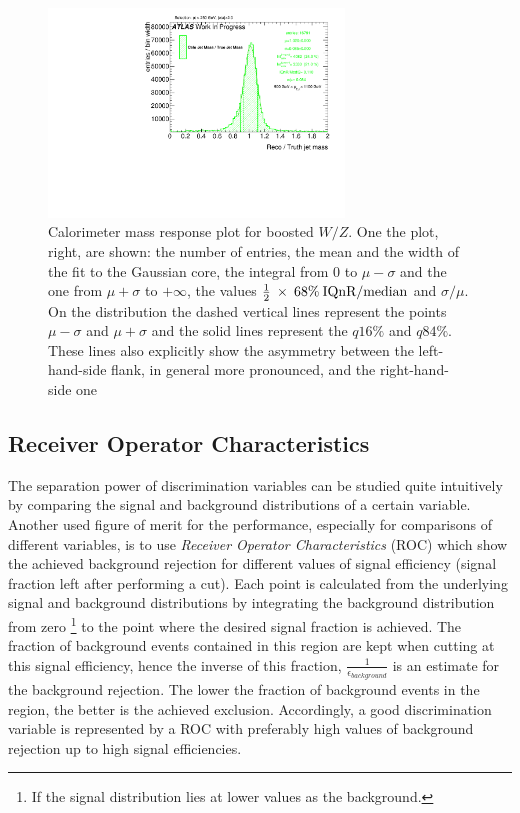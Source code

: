 \begin{figure}[!ht]
  \centering
      \includegraphics[width=0.7\textwidth]{jet_part/8ResponsePTJ_h_JetRatio_mJ05CALO.pdf}
  \caption[$\mcal$ response single $\pt$ bin]{Calorimeter mass response plot for boosted $W/Z$. One the plot, right, are shown: the number of entries, the mean and the width of the fit to the Gaussian core, the integral from 0 to $\mu-\sigma$ and the one from $\mu+\sigma$ to $+\infty$, the values $\frac{1}{2}\: \times\: 68\% \:\textrm{IQnR/median}$ and $\sigma/\mu$. On the distribution the dashed vertical lines represent the points $\mu-\sigma$ and $\mu+\sigma$ and the solid lines represent the $q16\%$ and $q84\%$. These lines also explicitly show the asymmetry between the left-hand-side flank, in general more pronounced, and the right-hand-side one}
  \label{fig:iqrbin}
\end{figure}


\subsection{Receiver Operator Characteristics}\label{sec:ROC}
The separation power of discrimination variables can be studied quite intuitively by comparing the signal and background distributions of a certain variable. Another used figure of merit for the performance, especially for comparisons of different variables, is to use \textit{Receiver Operator Characteristics} (ROC) which show the achieved background rejection for different values of signal efficiency (signal fraction left after performing a cut). 
Each point is calculated from the underlying signal and background distributions by integrating the background distribution from zero \footnote[1]{If the signal distribution lies at lower values as the background.} to the point where the desired signal fraction is achieved. The fraction of background events contained in this region are kept when cutting at this signal efficiency, hence the inverse of this fraction, $\frac{1}{\epsilon_{background}}$ is an estimate for the background rejection. The lower the fraction of background events in the region, the better is the achieved exclusion. Accordingly, a good discrimination variable is represented by a ROC with preferably high values of background rejection up to high signal efficiencies.

